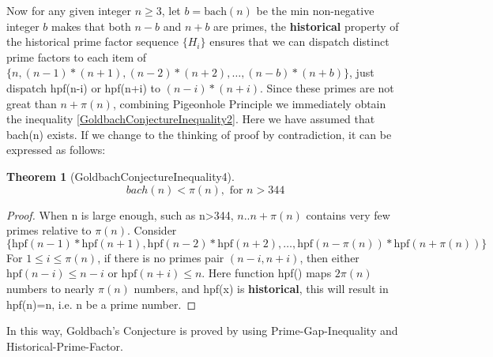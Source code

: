 \documentclass[12pt,a4paper,reqno]{amsart}
\numberwithin{equation}{section}
\theoremstyle{plain}
\newtheorem{theorem}{Theorem}[section]
\theoremstyle{definition}
\begin{document}
	Now for any given integer $n \geq 3$, let $b=\text{bach}(n)$ be the min non-negative integer 
	$b$ makes that both $n-b$ and $n+b$ are primes, the \textbf{historical} property 
	of the historical prime factor sequence $\{H_i\}$ ensures that we can dispatch 
	distinct prime factors to each item of  
	$\{n,(n-1)*(n+1),(n-2)*(n+2),\dots,(n-b)*(n+b)\}$, just dispatch hpf(n-i) or hpf(n+i) 
	to $(n-i)*(n+i)$. Since these primes are not great than $n+\pi(n)$, combining 
	Pigeonhole Principle we immediately obtain the inequality \eqref{GoldbachConjectureInequality2}. 
	Here we have assumed that bach(n) exists. If we change to the thinking of 
	proof by contradiction, it can be expressed as follows: 
	\begin{theorem}[GoldbachConjectureInequality4]
		\begin{equation}
			bach(n) < \pi(n), \text{ for } n>344
		\end{equation}
	\end{theorem}
	\begin{proof}
		When n is large enough, such as n>344, $n..n+\pi(n)$ contains very few primes 
		relative to $\pi(n)$. Consider 
		\[ \big\{\text{hpf}(n-1)*\text{hpf}(n+1),\text{hpf}(n-2)*\text{hpf}(n+2), \ldots ,\text{hpf}(n-\pi(n))*\text{hpf}(n+\pi(n))\big\} \]
		For $1 \leq i \leq \pi(n)$, if there is no primes pair $(n-i,n+i)$,  
		then either $\text{hpf}(n-i) \le n-i$ or $\text{hpf}(n+i) \le n$. 
		Here function hpf() maps $2\pi(n)$ numbers to nearly $\pi(n)$ numbers, 
		and hpf(x) is \textbf{historical}, this will result in hpf(n)=n, 
		i.e. n be a prime number. 
	\end{proof}
	In this way, Goldbach's Conjecture is proved by using Prime-Gap-Inequality and Historical-Prime-Factor. 
\end{document}
